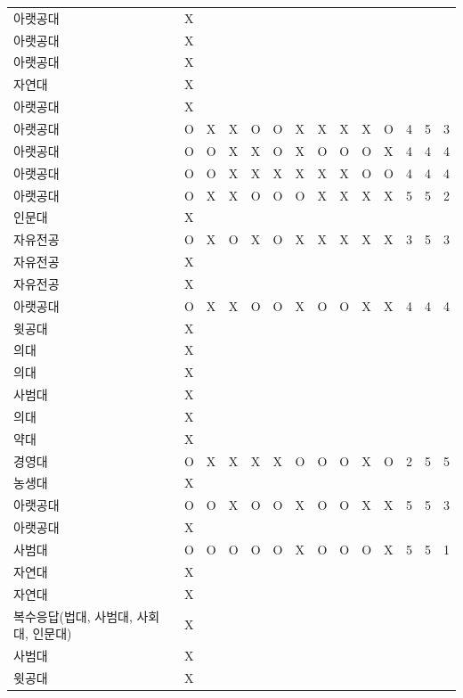 \documentclass[11pt,a4paper]{article}
\begin{document}
\begin{center}
\begin{supertabular}{ | p{2cm} | x{1.6cm} | x{0.5cm} | x{0.5cm} | x{0.5cm} | x{0.5cm} | x{0.5cm} | x{0.5cm} | x{0.5cm} | x{0.5cm} | x{0.5cm} | x{0.5cm} | x{0.5cm} | x{0.5cm} | }
아랫공대 & X & & & & & & & & & & & & \\
아랫공대 & X & & & & & & & & & & & & \\
아랫공대 & X & & & & & & & & & & & & \\
자연대 & X & & & & & & & & & & & & \\
아랫공대 & X & & & & & & & & & & & & \\
아랫공대 & O & X & X & O & O & X & X & X & X & O & 4 & 5 & 3 \\
아랫공대 & O & O & X & X & O & X & O & O & O & X & 4 & 4 & 4 \\
아랫공대 & O & O & X & X & X & X & X & X & O & O & 4 & 4 & 4 \\
아랫공대 & O & X & X & O & O & O & X & X & X & X & 5 & 5 & 2 \\
인문대 & X & & & & & & & & & & & & \\
자유전공 & O & X & O & X & O & X & X & X & X & X & 3 & 5 & 3 \\
자유전공 & X & & & & & & & & & & & & \\
자유전공 & X & & & & & & & & & & & & \\
아랫공대 & O & X & X & O & O & X & O & O & X & X & 4 & 4 & 4 \\
윗공대 & X & & & & & & & & & & & & \\
의대 & X & & & & & & & & & & & & \\
의대 & X & & & & & & & & & & & & \\
사범대 & X & & & & & & & & & & & & \\
의대 & X & & & & & & & & & & & & \\
약대 & X & & & & & & & & & & & & \\
경영대 & O & X & X & X & X & O & O & O & X & O & 2 & 5 & 5 \\
농생대 & X & & & & & & & & & & & & \\
아랫공대 & O & O & X & O & O & X & O & O & X & X & 5 & 5 & 3 \\
아랫공대 & X & & & & & & & & & & & & \\
사범대 & O & O & O & O & O & X & O & O & O & X & 5 & 5 & 1 \\
자연대 & X & & & & & & & & & & & & \\
자연대 & X & & & & & & & & & & & & \\
복수응답(법대, 사범대, 사회대, 인문대) & X & & & & & & & & & & & & \\
사범대 & X & & & & & & & & & & & & \\
윗공대 & X & & & & & & & & & & & & \\

\end{supertabular}
\end{center}
\end{document}
